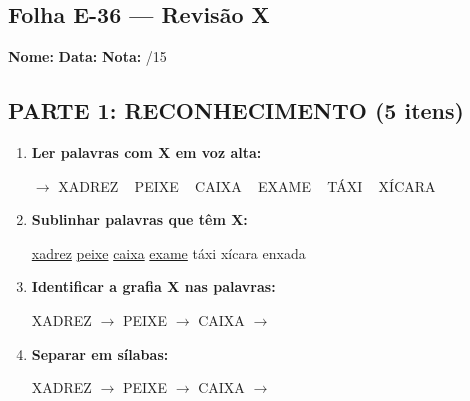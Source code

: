 \subsection{Folha E-36 --- Revisão X}
\begin{exercicio}



\noindent\textbf{Nome:} \underline{\hspace{3.2cm}} \quad \textbf{Data:} \underline{\hspace{1.6cm}} \quad \textbf{Nota:} \underline{\hspace{0.9cm}}/15


\subsection*{PARTE 1: RECONHECIMENTO (5 itens)}

\begin{enumerate}

  \item \textbf{Ler palavras com X em voz alta:}
  \begin{center}
  $\rightarrow$ XADREZ ~ PEIXE ~ CAIXA ~ EXAME ~ TÁXI ~ XÍCARA
  \end{center}

  \item \textbf{Sublinhar palavras que têm X:}

\begin{center}
  \uline{xadrez} \quad \uline{peixe} \quad \uline{caixa} \quad \uline{exame} \quad táxi \quad xícara \quad enxada
\end{center}

  \item \textbf{Identificar a grafia X nas palavras:}
  \begin{center}
  XADREZ $\rightarrow$ \underline{\hspace{1cm}} \quad PEIXE $\rightarrow$ \underline{\hspace{1cm}} \quad CAIXA $\rightarrow$ \underline{\hspace{1cm}}
  \end{center}

  \item \textbf{Separar em sílabas:}
  \begin{center}
  XADREZ $\rightarrow$ \underline{\hspace{1.2cm}} \quad PEIXE $\rightarrow$ \underline{\hspace{1.2cm}} \quad CAIXA $\rightarrow$ \underline{\hspace{1.2cm}}
  \end{center}


\end{enumerate}
\end{exercicio}

